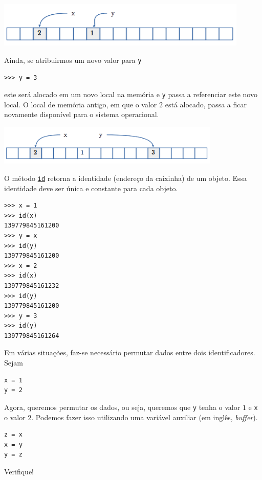 \begin{center}
  \includegraphics[max width=0.9\textwidth]{./cap_lingua/dados/fig_aloc_mem/xRecebe2}
\end{center}

Ainda, se atribuirmos um novo valor para \lstinline+y+

\begin{lstlisting}
>>> y = 3
\end{lstlisting}

este será alocado em um novo local na memória e \lstinline+y+ passa a referenciar este novo local. O local de memória antigo, em que o valor $2$ está alocado, passa a ficar novamente disponível para o sistema operacional.

\begin{center}
  \includegraphics[width=0.8\textwidth]{./cap_lingua/dados/fig_aloc_mem/yRecebe3}
\end{center}

\begin{obs}
  O método {\python} \href{https://docs.python.org/3/library/functions.html\#id}{\lstinline+id+} retorna a identidade (endereço da caixinha) de um objeto. Essa identidade deve ser única e constante para cada objeto.

\begin{lstlisting}
>>> x = 1
>>> id(x)
139779845161200
>>> y = x
>>> id(y)
139779845161200
>>> x = 2
>>> id(x)
139779845161232
>>> id(y)
139779845161200
>>> y = 3
>>> id(y)
139779845161264
\end{lstlisting}

\end{obs}

\begin{ex}\label{cap_lingua_sec_dados:ex:trocaVar}
Em várias situações, faz-se necessário permutar dados entre dois identificadores. Sejam

\begin{lstlisting}
x = 1
y = 2
\end{lstlisting}

Agora, queremos permutar os dados, ou seja, queremos que \lstinline+y+ tenha o valor $1$ e \lstinline+x+ o valor $2$. Podemos fazer isso utilizando uma variável auxiliar (em inglês, \textit{buffer}).

\begin{lstlisting}
z = x
x = y
y = z
\end{lstlisting}

Verifique!
\end{ex}

